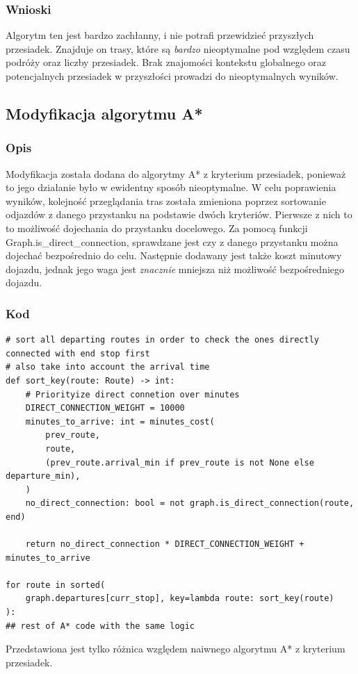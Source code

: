 \documentclass[a4paper, 12pt]{article}
\begin{document}
  \subsubsection{Wnioski}
  Algorytm ten jest bardzo zachłanny, i nie potrafi przewidzieć przyszłych przesiadek.
  Znajduje on trasy, które są \textit{bardzo} nieoptymalne pod względem czasu 
  podróży oraz liczby przesiadek. Brak znajomości kontekstu globalnego oraz 
  potencjalnych przesiadek w przyszłości prowadzi do nieoptymalnych wyników.

  \subsection{Modyfikacja algorytmu A*}

  \subsubsection{Opis}
  Modyfikacja została dodana do algorytmy A* z kryterium przesiadek, 
  ponieważ to jego działanie było w ewidentny sposób nieoptymalne.
  W celu poprawienia wyników, kolejność przeglądania tras została zmieniona
  poprzez sortowanie odjazdów z danego przystanku na podstawie dwóch kryteriów.
  Pierwsze z nich to to możliwość dojechania do przystanku docelowego.
  Za pomocą funkcji Graph.is\_direct\_connection, sprawdzane jest czy z danego przystanku
  można dojechać bezpośrednio do celu. Następnie dodawany jest także koszt minutowy dojazdu,
  jednak jego waga jest \textit{znacznie} mniejsza niż możliwość bezpośredniego dojazdu.

  \subsubsection{Kod}
\begin{lstlisting}
# sort all departing routes in order to check the ones directly connected with end stop first
# also take into account the arrival time
def sort_key(route: Route) -> int:
    # Priorityize direct connetion over minutes
    DIRECT_CONNECTION_WEIGHT = 10000
    minutes_to_arrive: int = minutes_cost(
        prev_route,
        route,
        (prev_route.arrival_min if prev_route is not None else departure_min),
    )
    no_direct_connection: bool = not graph.is_direct_connection(route, end)

    return no_direct_connection * DIRECT_CONNECTION_WEIGHT + minutes_to_arrive

for route in sorted(
    graph.departures[curr_stop], key=lambda route: sort_key(route)
):
## rest of A* code with the same logic
\end{lstlisting}
Przedstawiona jest tylko różnica względem naiwnego algorytmu A* z kryterium przesiadek.
\end{document}
